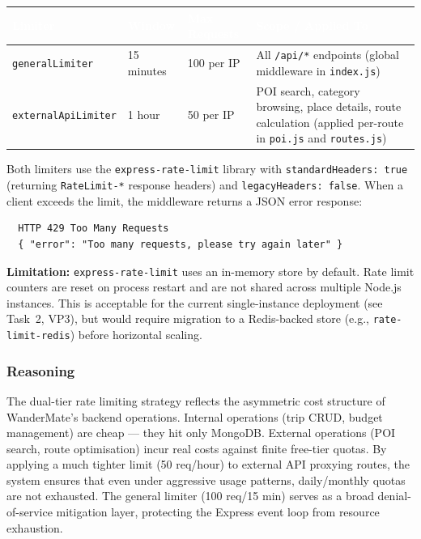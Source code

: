 \documentclass[12pt, a4paper]{article}
\newcommand{\thcell}[1]{\textcolor{white}{\textbf{\small #1}}}
\newcommand{\code}[1]{\texttt{\small #1}}
\begin{document}
\begin{longtable}{L{3.0cm} C{2.5cm} C{2.5cm} L{5.0cm}}
\toprule
{}
\thcell{Limiter} & \thcell{Window} & \thcell{Max Requests} & \thcell{Scope / Applied To} \\
\midrule
\endhead
\bottomrule
\endfoot

\code{generalLimiter} & 15 minutes & 100 per IP & All \code{/api/*} endpoints (global middleware in \code{index.js}) \\

\code{externalApiLimiter} & 1 hour & 50 per IP & POI search, category browsing, place details, route calculation (applied per-route in \code{poi.js} and \code{routes.js}) \\

\end{longtable}

Both limiters use the \code{express-rate-limit} library with \code{standardHeaders: true} (returning \code{RateLimit-*} response headers) and \code{legacyHeaders: false}. When a client exceeds the limit, the middleware returns a JSON error response:

\begin{verbatim}
  HTTP 429 Too Many Requests
  { "error": "Too many requests, please try again later" }
\end{verbatim}

\begin{tcolorbox}[notebox]
  \textbf{Limitation:} \code{express-rate-limit} uses an in-memory store by default. Rate limit counters are reset on process restart and are not shared across multiple Node.js instances. This is acceptable for the current single-instance deployment (see Task~2, VP3), but would require migration to a Redis-backed store (e.g., \code{rate-limit-redis}) before horizontal scaling.
\end{tcolorbox}

\subsubsection{Reasoning}

The dual-tier rate limiting strategy reflects the asymmetric cost structure of WanderMate's backend operations. Internal operations (trip CRUD, budget management) are cheap --- they hit only MongoDB. External operations (POI search, route optimisation) incur real costs against finite free-tier quotas. By applying a much tighter limit (50 req/hour) to external API proxying routes, the system ensures that even under aggressive usage patterns, daily/monthly quotas are not exhausted. The general limiter (100 req/15 min) serves as a broad denial-of-service mitigation layer, protecting the Express event loop from resource exhaustion.
\end{document}
